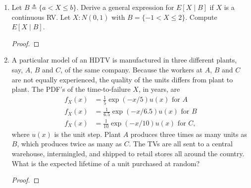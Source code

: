 \documentclass[paper=usletter, fontsize=12pt]{article}
\begin{document}
\begin{enumerate}
\begin{enumerate}
\begin{proof}
                \begin{align*}
                    P(W_m) & = \int_{0}^{1}P(W_m \mid X=x)f_X(x)\diff{x}\\
                    & = \int_{0}^{1}\binom{n}{m}x^m(1-x)^{n-m}f_X(x)\diff{x}\\
                    & = \binom{n}{m}\frac{m!(n-m)!}{(n+1)!}  \qedhere
                \end{align*}
                \endgroup

            \end{proof}

        \end{enumerate}

        \item Let $B \triangleq \{a < X \le b\}$. Derive a general expression
        for $E[X \mid B]$ if $X$ is a continuous RV. Let $X : N(0,1)$ with
        $B=\{-1 < X \le 2\}$. Compute $E[X \mid B]$.
        \begin{proof}
        \end{proof}

        \item A particular model of an HDTV is manufactured in three different
        plants, say, $A$, $B$ and $C$, of the same company. Because the workers
        at $A$, $B$ and $C$ are not equally experienced, the quality of the
        units differs from plant to plant. The PDF's of the time-to-failure
        $X$, in years, are
        \begin{align*}
            f_X(x) &= \frac{1}{5}\exp(-x/5)u(x) \text{ for } A\\
            f_X(x) &= \frac{1}{6.5}\exp(-x/6.5)u(x) \text{ for } B\\
            f_X(x) &= \frac{1}{10}\exp(-x/10)u(x) \text{ for } C,
        \end{align*}
        \endgroup
        where $u(x)$ is the unit step. Plant $A$ produces three times as many
        units as $B$, which produces twice as many as $C$. The TVs are all sent
        to a central warehouse, intermingled, and shipped to retail stores all
        around the country. What is the expected lifetime of a unit purchased
        at random?
        \begin{proof}


\end{proof}
\end{enumerate}
\end{document}
